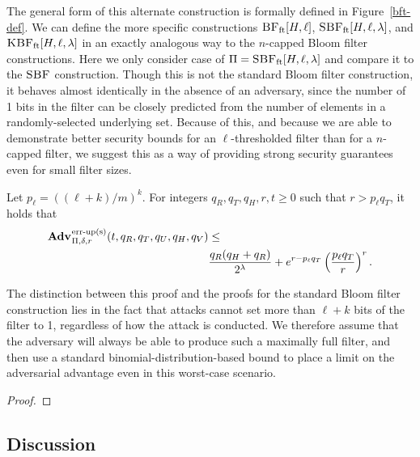 The general form of this alternate construction is formally defined in
Figure~\ref{bft-def}. We can define the more specific constructions
$\textnormal{\textsc{BF}}_\mathrm{ft}[H,\ell]$, $\textnormal{\textsc{SBF}}_\mathrm{ft}[H,\ell,\lambda]$, and
$\textnormal{\textsc{KBF}}_\mathrm{ft}[H,\ell,\lambda]$ in an exactly analogous way to the $n$-capped
Bloom filter constructions. Here we only consider case of
$\Pi = \textnormal{\textsc{SBF}}_\mathrm{ft}[H,\ell,\lambda]$ and compare it to the $\textnormal{\textsc{SBF}}$
construction. Though this is not the standard Bloom filter construction, it
behaves almost identically in the absence of an adversary, since the number of
1 bits in the filter can be closely predicted from the number of elements in a
randomly-selected underlying set. Because of this, and because we are able to
demonstrate better security bounds for an $\ell$-thresholded filter than for a
$n$-capped filter, we suggest this as a way of providing strong security
guarantees even for small filter sizes.

%
\begin{theorem}\label{thm:bf-thr-bound}
Let $p_\ell = ((\ell+k)/m)^k$. For integers $q_R, q_T, q_H, r, t \geq 0$ such
that $r > p_\ell q_T$, it holds that
  \begin{equation*}
    \begin{aligned}
      \Adv{\erreps}_{\Pi,\delta,r}(t, q_R,q_T,q_U,q_H,q_V) &\leq \\
        & \frac{q_R(q_H+q_R)}{2^\lambda} + e^{r-p_\ell q_T}\left(\frac{p_\ell q_T}{r}\right)^r.
    \end{aligned}
  \end{equation*}
\end{theorem}

The distinction between this proof and the proofs for the standard Bloom filter
construction lies in the fact that attacks cannot set more than
$\ell+k$ bits of the filter to 1, regardless of how the attack is conducted.
We therefore assume that the adversary will always be able to produce such a
maximally full filter, and then use a standard binomial-distribution-based bound
to place a limit on the adversarial advantage even in this worst-case scenario.

\begin{proof}
  
\end{proof}


\subsection{Discussion}

